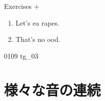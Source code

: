 \documentclass[aspectratio=169,xcolor={dvipsnames,table}]{beamer}
\begin{document}
\begin{frame}[plain]{Exercises  $+$ }
  \Large
  \begin{enumerate}
    \item<2-> Let's ea  rapes.
    \item<4-> That's no  ood.
  \end{enumerate}


  \hfill{\tiny 0109}\,{\scriptsize {}\,tg\_03}

\end{frame}
\section{様々な音の連続}
\end{document}
